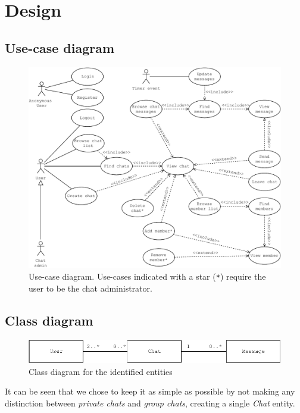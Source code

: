 \documentclass[10pt]{article}
\begin{document}
\clearpage
\section{Design}
\subsection{Use-case diagram}
\begin{figure}[h!]
    \centering
    \includegraphics[width=\textwidth]{figs/use_case_diagram}
    \caption{Use-case diagram. Use-cases indicated with a star (\texttt{*})
        require the user to be the chat administrator.}
    \label{fig:usecase}
\end{figure}

\subsection{Class diagram}
\begin{figure}[h!]
    \centering
    \includegraphics[width=\textwidth]{figs/class_diagram}
    \caption{Class diagram for the identified entities}
    \label{fig:class_diagram}
\end{figure}

It can be seen that we chose to keep it as simple as possible by not making  
any distinction between \emph{private chats} and \emph{group chats}, 
creating a single \emph{Chat} entity.
\end{document}
